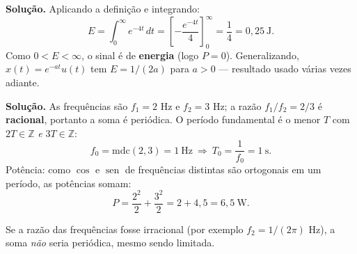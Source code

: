 

\textbf{Solução.} Aplicando a definição e integrando:
\[
  E=\int_0^{\infty}e^{-4t}\,dt
   =\left[-\frac{e^{-4t}}{4}\right]_{0}^{\infty}
   =\frac{1}{4}=0{,}25\ \text{J}.
\]
Como $0<E<\infty$, o sinal é de \textbf{energia} (logo $P=0$). Generalizando,
$x(t)=e^{-at}u(t)$ tem $E=1/(2a)$ para $a>0$ — resultado usado várias vezes
adiante.



\textbf{Solução.} As frequências são $f_1=2$ Hz e $f_2=3$ Hz; a razão
$f_1/f_2=2/3$ é \textbf{racional}, portanto a soma é periódica. O período
fundamental é o menor $T$ com $2T\in\mathbb{Z}$ \emph{e} $3T\in\mathbb{Z}$:
\[
  f_0=\mathrm{mdc}(2,3)=1\ \text{Hz}\ \Rightarrow\ T_0=\frac{1}{f_0}=1\ \text{s}.
\]
Potência: como $\cos$ e $\operatorname{sen}$ de frequências distintas são
ortogonais em um período, as potências somam:
\[
  P=\frac{2^2}{2}+\frac{3^2}{2}=2+4{,}5=6{,}5\ \text{W}.
\]


\begin{obs}
Se a razão das frequências fosse irracional (por exemplo $f_2=1/(2\pi)$ Hz),
a soma \emph{não} seria periódica, mesmo sendo limitada.
\end{obs}
